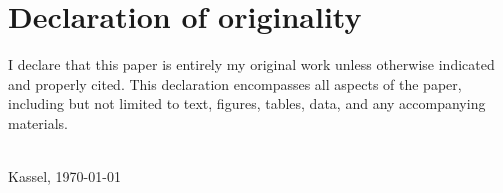 \section*{Declaration of originality}
\label{sec:dec_originality}

I declare that this paper is entirely my
original work unless otherwise indicated and properly cited. 
This declaration encompasses all aspects of
the paper, including but not limited to text, figures, tables, data, and any accompanying materials.
\newline

\noindent \underline{ \hspace{6cm}} 
\\ Kassel, \today \hspace{1cm}